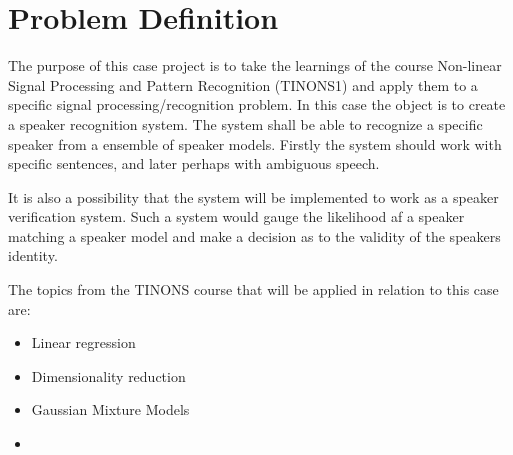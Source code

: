 \documentclass[Main]{subfiles}
\begin{document}
\chapter{Problem Definition}
The purpose of this case project is to take the learnings of the course Non-linear Signal Processing and Pattern Recognition (TINONS1) and apply them to a specific signal processing/recognition problem.
In this case the object is to create a speaker recognition system.
The system shall be able to recognize a specific speaker from a ensemble of speaker models.
Firstly the system should work with specific sentences, and later perhaps with ambiguous speech.

It is also a possibility that the system will be implemented to work as a speaker verification system.
Such a system would gauge the likelihood af a speaker matching a speaker model and make a decision as to the validity of the speakers identity.

The topics from the TINONS course that will be applied in relation to this case are:
\begin{itemize}
\item Linear regression 

\item Dimensionality reduction

\item Gaussian Mixture Models

\item {}

\cite{RefWorks:22}

\end{itemize}
\end{document}
